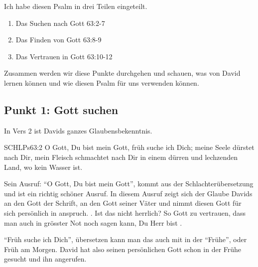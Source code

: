 \documentclass[14pt]{../../inc/mybib}
\begin{document}
    \begin{block}
        Ich habe diesen Psalm in drei Teilen eingeteilt. 
        \begin{enumerate}
            \item Das Suchen nach Gott  {63:2-7}
            \item Das Finden von Gott  {63:8-9}
            \item Das Vertrauen in Gott  {63:10-12}
        \end{enumerate}
        Zusammen werden wir diese Punkte durchgehen und schauen, was  von David lernen können und wie  diesen Psalm für uns verwenden können.
    \end{block}

    \subsection*{Punkt 1: Gott suchen}
    \begin{block}
    In Vers 2 ist Davids ganzes Glaubensbekenntnis. 
    \begin{bibelbox}{SCHL}{Ps}{63:2}
        O Gott, Du bist mein Gott, früh suche ich Dich; meine Seele dürstet nach Dir, mein Fleisch schmachtet nach Dir in einem dürren und lechzenden Land, wo kein Wasser ist.
    \end{bibelbox}
    Sein Ausruf: \enquote{O Gott, Du bist mein Gott}, kommt aus der Schlachterübersetzung und ist ein richtig schöner Ausruf. In diesem Ausruf zeigt sich der Glaube Davids an den Gott der Schrift, an den Gott seiner Väter und nimmt diesen Gott für sich persönlich in anspruch. . Ist das nicht herrlich? So  Gott zu vertrauen, dass man auch in grösster Not noch sagen kann, Du Herr bist . 

    \enquote{Früh suche ich Dich}, übersetzen kann man das auch mit in der \enquote{Frühe}, oder Früh am Morgen. David hat also seinen persönlichen Gott schon in der Frühe gesucht und ihn angerufen.
    \end{block}
\end{document}
